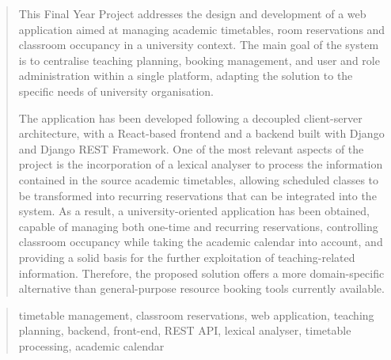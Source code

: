 \documentclass[a4paper,12pt,twoside]{memoir}
\begin{document}
\renewcommand*\abstractname{Abstract}
\begin{abstract}
This Final Year Project addresses the design and development of a web application aimed at managing academic timetables, room reservations and classroom occupancy in a university context. The main goal of the system is to centralise teaching planning, booking management, and user and role administration within a single platform, adapting the solution to the specific needs of university organisation.

The application has been developed following a decoupled client-server architecture, with a React-based frontend and a backend built with Django and Django REST Framework. One of the most relevant aspects of the project is the incorporation of a lexical analyser to process the information contained in the source academic timetables, allowing scheduled classes to be transformed into recurring reservations that can be integrated into the system.
As a result, a university-oriented application has been obtained, capable of managing both one-time and recurring reservations, controlling classroom occupancy while taking the academic calendar into account, and providing a solid basis for the further exploitation of teaching-related information. Therefore, the proposed solution offers a more domain-specific alternative than general-purpose resource booking tools currently available.
\end{abstract}

\renewcommand*\abstractname{Keywords}
\begin{abstract}
timetable management, classroom reservations, web application, teaching planning, backend, front-end, REST API, lexical analyser, timetable processing, academic calendar
\end{abstract}

\clearpage

\tableofcontents

\clearpage

\listoffigures

\clearpage

\listoftables
\clearpage

\mainmatter











\end{document}
